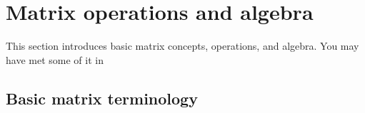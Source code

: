 
\section{Matrix operations and algebra}
\label{sec:moaa}
\secttoc

This section introduces basic matrix concepts, operations, and algebra.
You may have met some of it in 


\subsection{Basic matrix terminology}
\label{sec:bmt}


